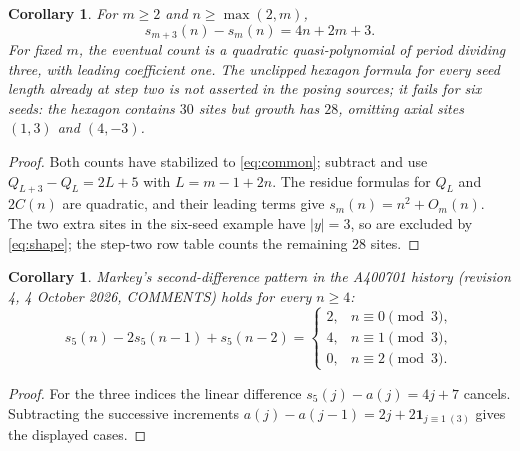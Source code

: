 \documentclass[11pt]{article}
\newtheorem{corollary}[theorem]{Corollary}
\begin{document}
\begin{corollary}\label{cor:seedlength}
For $m\geq2$ and $n\geq\max(2,m)$,
\[
 s_{m+3}(n)-s_m(n)=4n+2m+3.
\]
For fixed $m$, the eventual count is a quadratic quasi-polynomial of period
dividing three, with leading coefficient one. The unclipped hexagon formula
for every seed length already at step two is not asserted in the posing
sources; it fails for six seeds: the hexagon contains $30$ sites but growth
has $28$, omitting axial sites $(1,3)$ and $(4,-3)$.
\end{corollary}
\begin{proof}
Both counts have stabilized to \eqref{eq:common}; subtract and use
$Q_{L+3}-Q_L=2L+5$ with $L=m-1+2n$.
The residue formulas for $Q_L$ and $2C(n)$ are quadratic, and their leading
terms give $s_m(n)=n^2+O_m(n)$. The two extra sites in the six-seed example
have $|y|=3$, so are excluded by \eqref{eq:shape}; the step-two row table
counts the remaining $28$ sites.
\end{proof}

\begin{corollary}\label{cor:second}
Markey's second-difference pattern in the A400701 history (revision 4,
4 October 2026, COMMENTS) holds for every $n\geq4$:
\[
 s_5(n)-2s_5(n-1)+s_5(n-2)=
 \begin{cases}2,&n\equiv0\pmod3,\\4,&n\equiv1\pmod3,\\0,&n\equiv2\pmod3.
 \end{cases}
\]
\end{corollary}
\begin{proof}
For the three indices the linear difference $s_5(j)-a(j)=4j+7$
cancels. Subtracting the successive increments
$a(j)-a(j-1)=2j+2\mathbf1_{j\equiv1\ (3)}$ gives the displayed cases.
\end{proof}
\end{document}
